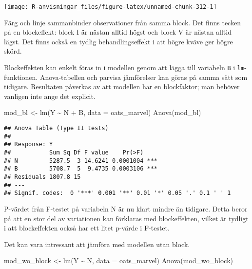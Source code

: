 \documentclass[
]{book}
\newenvironment{Shaded}{\begin{snugshade}}{\end{snugshade}}
\newcommand{\AttributeTok}[1]{\textcolor[rgb]{0.77,0.63,0.00}{#1}}
\newcommand{\FunctionTok}[1]{\textcolor[rgb]{0.00,0.00,0.00}{#1}}
\newcommand{\NormalTok}[1]{#1}
\newcommand{\OtherTok}[1]{\textcolor[rgb]{0.56,0.35,0.01}{#1}}
\newcommand{\SpecialCharTok}[1]{\textcolor[rgb]{0.00,0.00,0.00}{#1}}
\theoremstyle{definition}
\theoremstyle{definition}
\theoremstyle{definition}
\theoremstyle{definition}
\theoremstyle{remark}
\begin{document}
\begin{center}\texttt{[image: R-anvisningar\_files/figure-latex/unnamed-chunk-312-1]} \end{center}

Färg och linje sammanbinder observationer från samma block. Det finns tecken på en blockeffekt: block I är nästan alltid högst och block V är nästan alltid lägst. Det finns också en tydlig behandlingseffekt i att högre kväve ger högre skörd.

Blockeffekten kan enkelt föras in i modellen genom att lägga till variabeln \texttt{B} i \texttt{lm}-funktionen. Anova-tabellen och parvisa jämförelser kan göras på samma sätt som tidigare. Resultaten påverkas av att modellen har en blockfaktor; man behöver vanligen inte ange det explicit.

\begin{Shaded}
\begin{Highlighting}[]
\NormalTok{mod\_bl }\OtherTok{\textless{}{-}} \FunctionTok{lm}\NormalTok{(Y }\SpecialCharTok{\textasciitilde{}}\NormalTok{ N }\SpecialCharTok{+}\NormalTok{ B, }\AttributeTok{data =}\NormalTok{ oats\_marvel)}
\FunctionTok{Anova}\NormalTok{(mod\_bl)}
\end{Highlighting}
\end{Shaded}

\begin{verbatim}
## Anova Table (Type II tests)
## 
## Response: Y
##           Sum Sq Df F value    Pr(>F)    
## N         5287.5  3 14.6241 0.0001004 ***
## B         5708.7  5  9.4735 0.0003106 ***
## Residuals 1807.8 15                      
## ---
## Signif. codes:  0 '***' 0.001 '**' 0.01 '*' 0.05 '.' 0.1 ' ' 1
\end{verbatim}

P-värdet från F-testet på variabeln N är nu klart mindre än tidigare. Detta beror på att en stor del av variationen kan förklaras med blockeffekten, vilket är tydligt i att blockeffekten också har ett litet p-värde i F-testet.

Det kan vara intressant att jämföra med modellen utan block.

\begin{Shaded}
\begin{Highlighting}[]
\NormalTok{mod\_wo\_block }\OtherTok{\textless{}{-}} \FunctionTok{lm}\NormalTok{(Y }\SpecialCharTok{\textasciitilde{}}\NormalTok{ N, }\AttributeTok{data =}\NormalTok{ oats\_marvel)}
\FunctionTok{Anova}\NormalTok{(mod\_wo\_block)}
\end{Highlighting}
\end{Shaded}
\end{document}
